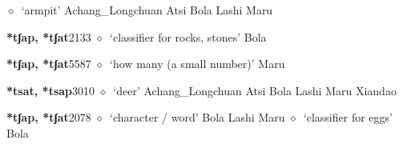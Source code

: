 \begin{list}{}{\leftmargin=1.5em \itemindent=-1.5em}
\hspace{1ex}
         $\diamond$~`armpit'
         Achang\_Longchuan 
\hspace{1ex}
         Atsi 
\hspace{1ex}
         Bola 
\hspace{1ex}
         Lashi 
\hspace{1ex}
         Maru 
  \item {\footnotesize \textbf{*tʃap, *tʃat}}{\tiny 2133}
\hspace{1ex}
         $\diamond$~`classifier for rocks, stones'
         Bola 
  \item {\footnotesize \textbf{*tʃap, *tʃat}}{\tiny 5587}
\hspace{1ex}
         $\diamond$~`how many (a small number)'
         Maru 
  \item {\footnotesize \textbf{*tsat, *tsap}}{\tiny 3010}
\hspace{1ex}
         $\diamond$~`deer'
         Achang\_Longchuan 
\hspace{1ex}
         Atsi 
\hspace{1ex}
         Bola 
\hspace{1ex}
         Lashi 
\hspace{1ex}
         Maru 
\hspace{1ex}
         Xiandao 
  \item {\footnotesize \textbf{*tʃap, *tʃat}}{\tiny 2078}
\hspace{1ex}
         $\diamond$~`character / word'
         Bola 
\hspace{1ex}
         Lashi 
\hspace{1ex}
         Maru 
\hspace{1ex}
         $\diamond$~`classifier for eggs'
         Bola 
\hspace{1ex}

\end{list}
